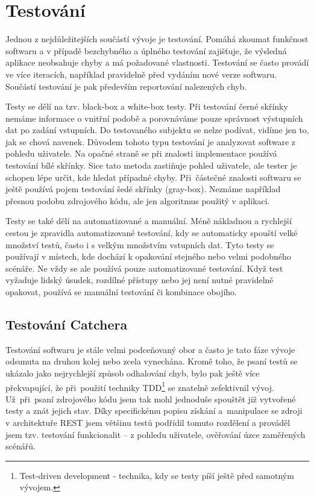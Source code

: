 \chapter{Testování}


Jednou z nejdůležitejších součástí vývoje je testování. Pomáhá zkoumat funkčnost softwaru a v případě bezchybného
a úplného testování zajišťuje, že výsledná aplikace neobsahuje chyby a má požadované vlastnosti.
Testování se často provádí ve více iteracích, například pravidelně před vydáním nové verze softwaru.
Součástí testování je pak především reportování nalezených chyb.

Testy se dělí na tzv. black-box a white-box testy. Při testování černé skřínky nemáme informace o vnitřní podobě a porovnáváme
pouze správnost výstupních dat po zadání vstupních. Do testovaného subjektu se nelze podívat, vidíme jen to, jak se chová navenek.
Důvodem tohoto typu testování je analyzovat software z pohledu uživatele.
Na opačné straně se při znalosti implementace používá testování bílé skřínky. Sice tato metoda zastiňuje pohled uživatele,
ale tester je schopen lépe určit, kde hledat případné chyby. Při~částečné znalosti softwaru se ještě používá pojem testování šedé skřínky (gray-box).
Neznáme například přesnou podobu zdrojového kódu, ale jen algoritmus použitý v aplikaci. 

Testy se také dělí na automatizované a manuální. Méně nákladnou a rychlejší cestou je zpravidla automatizované testování,
kdy se automaticky spouští velké množství testů, často i s velkým množstvím vstupních dat. Tyto testy se používají v místech,
kde dochází k opakování stejného nebo velmi podobného scénáře. Ne vždy se ale používá pouze automatizované testování.
Když test vyžaduje lidský úsudek, rozdílné přístupy nebo jej není nutné pravidelně opakovat, používá se manuální testování či kombinace obojího.

\section{Testování Catchera}

Testování softwaru je stále velmi podceňovaný obor a často je tato fáze vývoje odsunuta na druhou kolej nebo zcela vynechána.
Kromě toho, že psaní testů se ukázalo jako nejrychlejší způsob odhalování chyb, bylo pak ještě více překvapující, že při~použití
techniky TDD\footnote{Test-driven development - technika, kdy se testy píší ještě před samotným vývojem.} se znatelně zefektivnil
vývoj. Už~při~psaní zdrojového kódu jsem tak mohl jednoduše spouštět již vytvořené testy a znát jejich stav.
Díky specifickému popisu získání a~manipulace se zdroji v architektuře REST jsem většinu testů podřídil tomuto rozdělení a prováděl
jsem tzv. testování funkcionalit -- z pohledu uživatele, ověřování úzce zaměřených scénářů.

